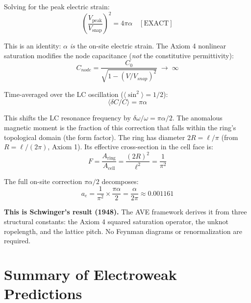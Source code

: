 Solving for the peak electric strain:
\begin{equation}
    \left(\frac{V_{\text{peak}}}{V_{\text{snap}}}\right)^2 = 4\pi\alpha \quad [\text{EXACT}]
\end{equation}

This is an identity: $\alpha$ \textit{is} the on-site electric strain. The Axiom 4 nonlinear saturation modifies the node capacitance (\emph{not} the constitutive permittivity):
\begin{equation}
    C_{node} = \frac{C_0}{\sqrt{1 - (V/V_{snap})^2}} \;\to\; \infty
\end{equation}

Time-averaged over the LC oscillation ($\langle\sin^2\rangle = 1/2$):
\begin{equation}
    \langle\delta C / C\rangle = \pi\alpha
\end{equation}

This shifts the LC resonance frequency by $\delta\omega/\omega = \pi\alpha/2$. The anomalous magnetic moment is the fraction of this correction that falls within the ring's topological domain (the form factor). The ring has diameter $2R = \ell/\pi$ (from $R = \ell/(2\pi)$, Axiom 1). Its effective cross-section in the cell face is:
\begin{equation}
    F = \frac{A_{\text{ring}}}{A_{\text{cell}}} = \frac{(2R)^2}{\ell^2} = \frac{1}{\pi^2}
\end{equation}

The full on-site correction $\pi\alpha/2$ decomposes:
\begin{equation}
    a_e = \frac{1}{\pi^2} \times \frac{\pi\alpha}{2} = \boxed{\frac{\alpha}{2\pi}} \approx 0.001161
\end{equation}

\textbf{This is Schwinger's result (1948).} The AVE framework derives it from three structural constants: the Axiom 4 squared saturation operator, the unknot ropelength, and the lattice pitch. No Feynman diagrams or renormalization are required.

\section{Summary of Electroweak Predictions}

